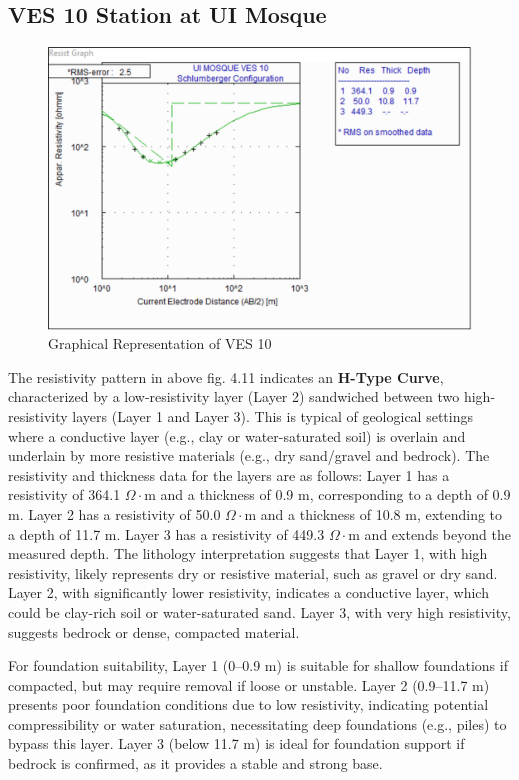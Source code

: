 \documentclass[12pt,a4paper]{report}
\begin{document}
\subsection{VES 10 Station at UI Mosque}

\begin{figure}[H]
    \centering
    \includegraphics[width=1.0\textwidth]{ui_ves10.png}
    \caption{Graphical Representation of VES 10}
    \label{fig:VES_10_Curve}
\end{figure}

The resistivity pattern in above fig. 4.11 indicates an \textbf{H-Type Curve}, characterized by a low-resistivity layer (Layer 2) sandwiched between two high-resistivity layers (Layer 1 and Layer 3). This is typical of geological settings where a conductive layer (e.g., clay or water-saturated soil) is overlain and underlain by more resistive materials (e.g., dry sand/gravel and bedrock). The resistivity and thickness data for the layers are as follows: Layer 1 has a resistivity of 364.1 $\Omega\cdot$m and a thickness of 0.9 m, corresponding to a depth of 0.9 m. Layer 2 has a resistivity of 50.0 $\Omega\cdot$m and a thickness of 10.8 m, extending to a depth of 11.7 m. Layer 3 has a resistivity of 449.3 $\Omega\cdot$m and extends beyond the measured depth. The lithology interpretation suggests that Layer 1, with high resistivity, likely represents dry or resistive material, such as gravel or dry sand. Layer 2, with significantly lower resistivity, indicates a conductive layer, which could be clay-rich soil or water-saturated sand. Layer 3, with very high resistivity, suggests bedrock or dense, compacted material.

For foundation suitability, Layer 1 (0--0.9 m) is suitable for shallow foundations if compacted, but may require removal if loose or unstable. Layer 2 (0.9--11.7 m) presents poor foundation conditions due to low resistivity, indicating potential compressibility or water saturation, necessitating deep foundations (e.g., piles) to bypass this layer. Layer 3 (below 11.7 m) is ideal for foundation support if bedrock is confirmed, as it provides a stable and strong base.
\end{document}
